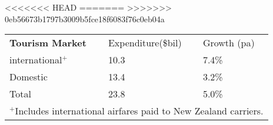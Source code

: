 <<<<<<< HEAD
=======
>>>>>>> 0eb56673b1797b3009b5fce18f6083f76c0eb04a
\begin{tabular}[t]{p{5cm}p{1.3cm}p{1.2cm}}
 \textbf{Tourism Market} & Expenditure(\$bil) & Growth (pa) \\ 
 international$^+$ & 10.3 & 7.4\% \\ 
  Domestic & 13.4 & 3.2\% \\ 
  Total & 23.8 & 5.0\% \\ 
  \multicolumn{3}{p{7.5cm}}{$^+$Includes international airfares paid to New Zealand carriers.}\ 
\end{tabular}
